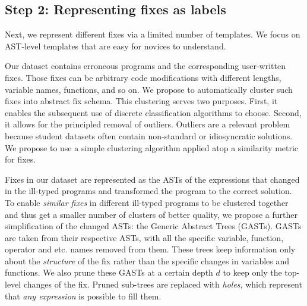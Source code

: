 \subsection{Step 2: Representing fixes as labels}
\label{subsec:step2}

Next, we represent different fixes via a limited number of templates. We focus
on AST-level templates that are easy for novices to understand.

 Our dataset contains erroneous programs and the
corresponding user-written fixes. Those fixes can be arbitrary code
modifications with different lengths, variable names, functions, and so on. We
propose to automatically cluster such fixes into abstract fix schema. This
clustering serves two purposes. First, it enables the subsequent use of discrete
classification algorithms to choose. Second, it allows for the principled
removal of outliers. Outliers are a relevant problem because student datasets
often contain non-standard or idiosyncratic solutions. We propose to use a
simple clustering algorithm applied atop a similarity metric for fixes.
%

Fixes in our dataset are represented as the ASTs of the expressions that changed
in the ill-typed programs and transformed the program to the correct solution.
To enable \emph{similar fixes} in different ill-typed programs to be clustered
together and thus get a smaller number of clusters of better quality, we propose
a further simplification of the changed ASTs: the Generic Abstract Trees
(GASTs). GASTs are taken from their respective ASTs, with all the specific
variable, function, operator and etc. names removed from them. These trees keep
information only about the \emph{structure} of the fix rather than the specific
changes in variables and functions. We also prune these GASTs at a certain depth
$d$ to keep only the top-level changes of the fix. Pruned sub-trees are replaced
with \emph{holes}, which represent that \emph{any expression} is possible to
fill them.


